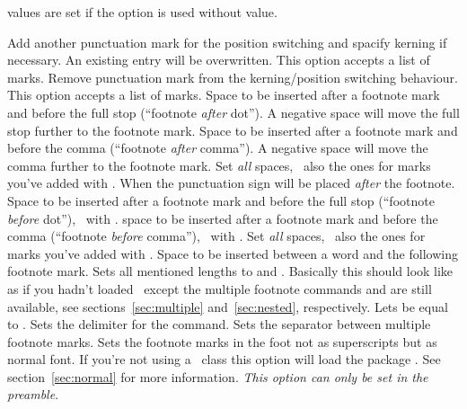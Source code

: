 \documentclass[load-preamble+]{cnltx-doc}
\begin{document}
 values are set if the option is used without value.
\begin{options}
    Add another punctuation mark for the position switching and spacify
    kerning if necessary.  An existing entry will be overwritten.  This option
    accepts a list of marks.
    Remove punctuation mark from the kerning/position switching behaviour.
    This option accepts a list of marks.
  \Default{-.06em}
    Space to be inserted after a footnote mark and before the full stop
    (``footnote \emph{after} dot'').  A negative space will move the full stop
    further to the footnote mark.
  \Default{-.06em}
    Space to be inserted after a footnote mark and before the comma
    (``footnote \emph{after} comma'').  A negative space will move the comma
    further to the footnote mark.
    Set \emph{all} spaces, \ie\ also the ones for marks you've added with
    .
    When  the punctuation sign will be placed \emph{after} the
    footnote.
  \Default{-.16em}
    Space to be inserted after a footnote mark and before the full stop
    (``footnote \emph{before} dot''), \ie\ with .
  \Default{-.16em}
    space to be inserted after a footnote mark and before the comma
    (``footnote \emph{before} comma''), \ie\ with .
    Set \emph{all} spaces, \ie\ also the ones for marks you've added with
    .
  \Default{.06em}
    Space to be inserted between a word and the following footnote mark.
    Sets all mentioned lengths to \code{0pt} and .
    Basically this should look like as if you hadn't loaded \fnpct\ except the
    multiple footnote commands and  are still available, see
    sections~\ref{sec:multiple} and~\ref{sec:nested}, respectively.
    Lets  be equal to .
  \Default{;}
    Sets the delimiter for the  command.
  \Default{,}
    Sets the separator between multiple footnote marks.
  \label{opt:normal-marks}
    Sets the footnote marks in the foot not as superscripts but as normal
    font.  If you're not using a \KOMAScript\ class this option will load
    the package .  See section~\ref{sec:normal} for more
    information.  \emph{This option can only be set in the preamble}.
\end{options}
\end{document}
